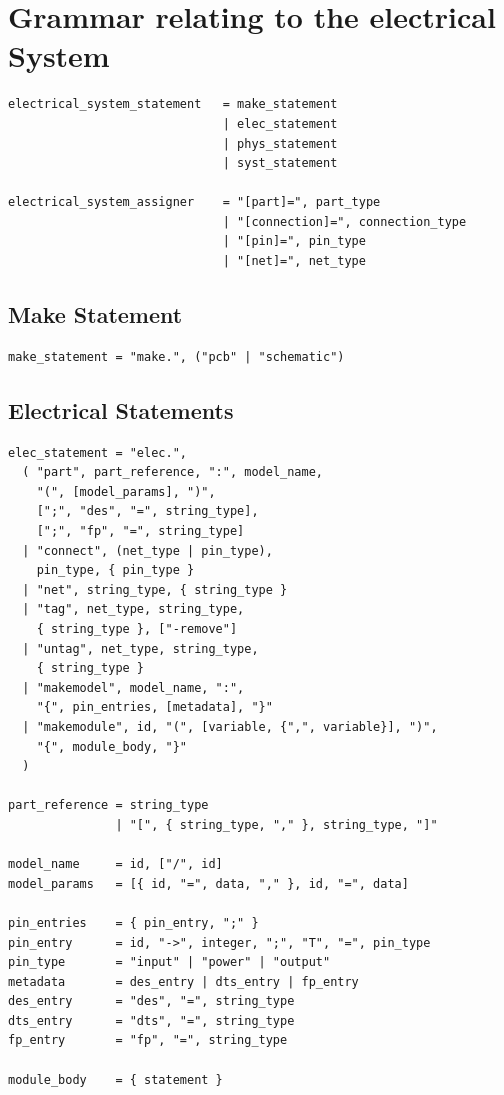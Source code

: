 \section{Grammar relating to the electrical System}
\begin{verbatim}
electrical_system_statement   = make_statement
                              | elec_statement
                              | phys_statement
                              | syst_statement

electrical_system_assigner    = "[part]=", part_type
                              | "[connection]=", connection_type
                              | "[pin]=", pin_type
                              | "[net]=", net_type
\end{verbatim}

\subsection{Make Statement}
\begin{verbatim}
make_statement = "make.", ("pcb" | "schematic")
\end{verbatim}

\subsection{Electrical Statements}
\begin{verbatim}
elec_statement = "elec.",
  ( "part", part_reference, ":", model_name,
    "(", [model_params], ")",
    [";", "des", "=", string_type],
    [";", "fp", "=", string_type]
  | "connect", (net_type | pin_type),
    pin_type, { pin_type }
  | "net", string_type, { string_type }
  | "tag", net_type, string_type,
    { string_type }, ["-remove"]
  | "untag", net_type, string_type,
    { string_type }
  | "makemodel", model_name, ":",
    "{", pin_entries, [metadata], "}"
  | "makemodule", id, "(", [variable, {",", variable}], ")",
    "{", module_body, "}"
  )

part_reference = string_type
               | "[", { string_type, "," }, string_type, "]"

model_name     = id, ["/", id]
model_params   = [{ id, "=", data, "," }, id, "=", data]

pin_entries    = { pin_entry, ";" }
pin_entry      = id, "->", integer, ";", "T", "=", pin_type
pin_type       = "input" | "power" | "output"
metadata       = des_entry | dts_entry | fp_entry
des_entry      = "des", "=", string_type
dts_entry      = "dts", "=", string_type
fp_entry       = "fp", "=", string_type

module_body    = { statement }
\end{verbatim}

